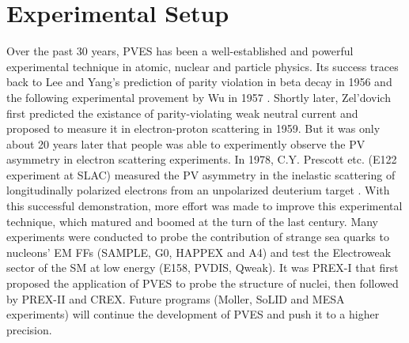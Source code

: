 \chapter{Experimental Setup}
Over the past 30 years, PVES has been a well-established and powerful 
experimental technique in atomic, nuclear and particle physics. Its success 
traces back to Lee and Yang's prediction of parity violation in beta decay in 1956 \cite{PhysRev.104.254}
and the following experimental provement by Wu in 1957 \cite{PhysRev.105.1413}.
Shortly later, Zel'dovich first predicted the existance of parity-violating weak 
neutral current and proposed to measure
it in electron-proton scattering \cite{Zeldovich} in 1959. But it was only about 
20 years later that people was able to experimently observe the PV asymmetry 
in electron scattering experiments. 
In 1978, C.Y. Prescott etc. (E122 experiment at SLAC) measured the PV asymmetry in the 
inelastic scattering of longitudinally 
polarized electrons from an unpolarized deuterium target \cite{PRESCOTT1978347}.
With this successful demonstration, more effort was made to improve this experimental
technique, which matured and boomed at the turn of the last century. Many experiments 
were conducted to probe the contribution of strange sea quarks
to nucleons' EM FFs (SAMPLE, G0, HAPPEX and A4) and test the Electroweak 
sector of the SM at low energy (E158, PVDIS, Qweak).
It was PREX-I that first proposed the application of PVES to probe the structure
of nuclei, then followed by PREX-II and CREX. Future programs (M\/oller, SoLID 
and MESA experiments) will continue the development of PVES and push it to a
higher precision.

